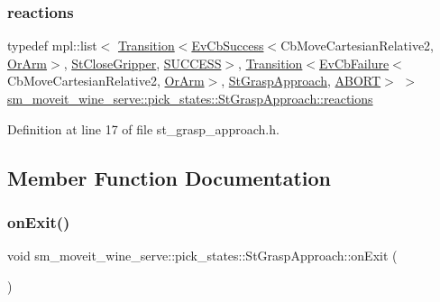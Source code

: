 \subsubsection{\texorpdfstring{reactions}{reactions}}
{\footnotesize\ttfamily typedef mpl\+::list$<$ \hyperlink{classsmacc_1_1Transition}{Transition}$<$\hyperlink{structsmacc_1_1EvCbSuccess}{Ev\+Cb\+Success}$<$Cb\+Move\+Cartesian\+Relative2, \hyperlink{classsm__moveit__wine__serve_1_1OrArm}{Or\+Arm}$>$, \hyperlink{structsm__moveit__wine__serve_1_1pick__states_1_1StCloseGripper}{St\+Close\+Gripper}, \hyperlink{structsmacc_1_1default__transition__tags_1_1SUCCESS}{S\+U\+C\+C\+E\+SS}$>$, \hyperlink{classsmacc_1_1Transition}{Transition}$<$\hyperlink{structsmacc_1_1EvCbFailure}{Ev\+Cb\+Failure}$<$Cb\+Move\+Cartesian\+Relative2, \hyperlink{classsm__moveit__wine__serve_1_1OrArm}{Or\+Arm}$>$, \hyperlink{structsm__moveit__wine__serve_1_1pick__states_1_1StGraspApproach}{St\+Grasp\+Approach}, \hyperlink{structsmacc_1_1default__transition__tags_1_1ABORT}{A\+B\+O\+RT}$>$ $>$ \hyperlink{structsm__moveit__wine__serve_1_1pick__states_1_1StGraspApproach_ac442fb60d47913f7c15d192661053714}{sm\+\_\+moveit\+\_\+wine\+\_\+serve\+::pick\+\_\+states\+::\+St\+Grasp\+Approach\+::reactions}}



Definition at line 17 of file st\+\_\+grasp\+\_\+approach.\+h.



\subsection{Member Function Documentation}
\mbox{\label{structsm__moveit__wine__serve_1_1pick__states_1_1StGraspApproach_a400190e1dd7e0411487b55e6025ddb72}} 
\subsubsection{\texorpdfstring{on\+Exit()}{onExit()}}
{\footnotesize\ttfamily void sm\+\_\+moveit\+\_\+wine\+\_\+serve\+::pick\+\_\+states\+::\+St\+Grasp\+Approach\+::on\+Exit (\begin{DoxyParamCaption}\item[{\hyperlink{structsmacc_1_1default__transition__tags_1_1ABORT}{A\+B\+O\+RT}}]{ }\end{DoxyParamCaption})\hspace{0.3cm}{\ttfamily [inline]}}



